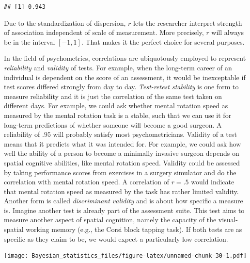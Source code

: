 \documentclass[]{svmono}
\newenvironment{Shaded}{\begin{snugshade}}{\end{snugshade}}
\newcommand{\KeywordTok}[1]{\textcolor[rgb]{0.13,0.29,0.53}{\textbf{#1}}}
\newcommand{\StringTok}[1]{\textcolor[rgb]{0.31,0.60,0.02}{#1}}
\newcommand{\OperatorTok}[1]{\textcolor[rgb]{0.81,0.36,0.00}{\textbf{#1}}}
\newcommand{\NormalTok}[1]{#1}
\theoremstyle{definition}
\theoremstyle{definition}
\theoremstyle{definition}
\theoremstyle{remark}
\begin{document}
\begin{verbatim}
## [1] 0.943
\end{verbatim}

Due to the standardization of dispersion, \(r\) lets the researcher
interpret strength of association independent of scale of measurement.
More precisely, \(r\) will always be in the interval \([-1,1]\). That
makes it the perfect choice for several purposes.

In the field of psychometrics, correlations are ubiquotously employed to
represent \emph{reliability} and \emph{validity} of tests. For example,
when the long-term career of an individual is dependent on the score of
an assessment, it would be inexceptable if test scores differed strongly
from day to day. \emph{Test-retest stability} is one form to measure
reliability and it is just the correlation of the same test taken on
different days. For example, we could ask whether mental rotation speed
as measured by the mental rotation task is a stable, such that we can
use it for long-term predictions of whether someone will become a good
surgeon. A reliability of \(.95\) will probably satisfy most
psychometricians. Validity of a test means that it predicts what it was
intended for. For example, we could ask how well the ability of a person
to become a minimally invasive surgeon depends on spatial cognitive
abilities, like mental rotation speed. Validity could be assessed by
taking performance scores from exercises in a surgery simulator and do
the correlation with mental rotation speed. A correlation of \(r = .5\)
would indicate that mental rotation speed as measured by the task has
rather limited validity. Another form is called \emph{discriminant
validity} and is about how specific a measure is. Imagine another test
is already part of the assessment suite. This test aims to measure
another aspect of spatial cognition, namely the capacity of the
visual-spatial working memory (e.g., the Corsi block tapping task). If
both tests are as specific as they claim to be, we would expect a
particularly low correlation.

\begin{Shaded}
\end{Shaded}

\texttt{[image: Bayesian\_statistics\_files/figure-latex/unnamed-chunk-30-1.pdf]}
\end{document}
